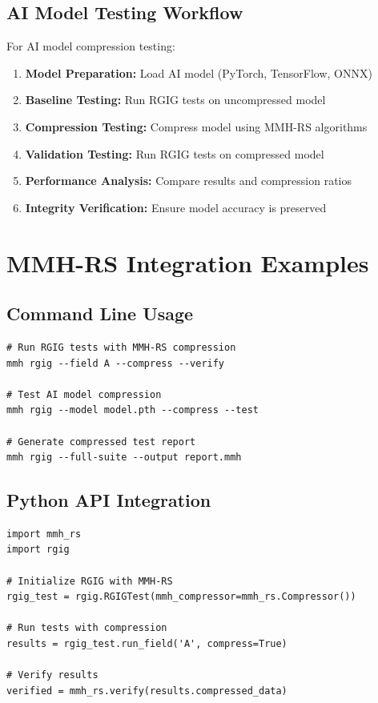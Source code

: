 \documentclass[11pt]{article}
\makeatletter
\newcommand{\inputnolabel}[1]{%
  \let\saved@label\label
  \let\label\@gobble
  \let\label\saved@label
}
\makeatother
\begin{document}
\subsection*{AI Model Testing Workflow}
For AI model compression testing:

\begin{enumerate}
  \item \textbf{Model Preparation:} Load AI model (PyTorch, TensorFlow, ONNX)
  \item \textbf{Baseline Testing:} Run RGIG tests on uncompressed model
  \item \textbf{Compression Testing:} Compress model using MMH-RS algorithms
  \item \textbf{Validation Testing:} Run RGIG tests on compressed model
  \item \textbf{Performance Analysis:} Compare results and compression ratios
  \item \textbf{Integrity Verification:} Ensure model accuracy is preserved
\end{enumerate}

\inputnolabel{fieldA}
\inputnolabel{fieldB}
\inputnolabel{fieldC}
\inputnolabel{fieldD}
\inputnolabel{fieldE}
\inputnolabel{fieldF}
\inputnolabel{fieldG}

\section*{MMH-RS Integration Examples}

\subsection*{Command Line Usage}
\begin{verbatim}
# Run RGIG tests with MMH-RS compression
mmh rgig --field A --compress --verify

# Test AI model compression
mmh rgig --model model.pth --compress --test

# Generate compressed test report
mmh rgig --full-suite --output report.mmh
\end{verbatim}

\subsection*{Python API Integration}
\begin{verbatim}
import mmh_rs
import rgig

# Initialize RGIG with MMH-RS
rgig_test = rgig.RGIGTest(mmh_compressor=mmh_rs.Compressor())

# Run tests with compression
results = rgig_test.run_field('A', compress=True)

# Verify results
verified = mmh_rs.verify(results.compressed_data)
\end{verbatim}
\end{document}
